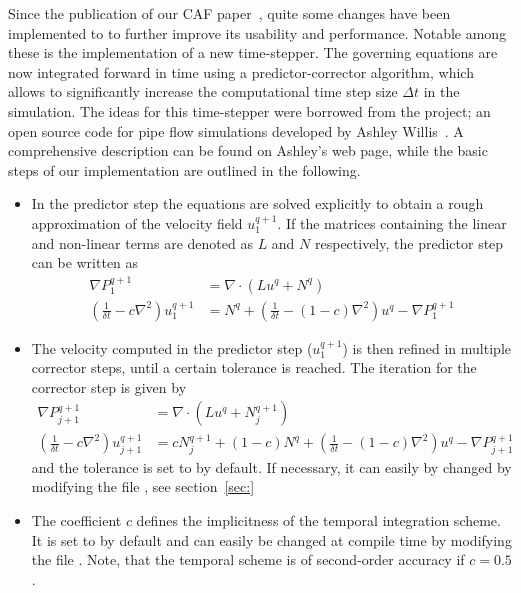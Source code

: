 \documentclass[a4paper, 11pt, DIV=11]{scrartcl}
\begin{document}
Since the publication of our CAF paper~\cite{Shi2015}, quite some changes have been
implemented to \nsc to further improve its usability and performance. Notable among
these is the implementation of a new time-stepper. The governing equations are now
integrated forward in time using a predictor-corrector algorithm, which allows to
significantly increase the computational time step size $\Delta t$ in the simulation.
The ideas for this time-stepper were borrowed from the \opf project; an open source
code for pipe flow simulations developed by Ashley Willis~\cite{Willis2017}. A
comprehensive description can be found on Ashley's web page, while the basic steps
of our implementation are outlined in the following.
\begin{itemize}

\item
In the predictor step the equations are solved explicitly to obtain a rough
approximation of the velocity field $u_1^{q+1}$. If the matrices containing
the linear and non-linear terms are denoted as $L$ and $N$ respectively, the
predictor step can be written as
\begin{align*}
\nabla P_1^{q+1} & = \nabla\cdot(Lu^q+N^q)\\
\left(\frac{1}{\delta t} - c\nabla^2\right) u_1^{q+1} & =
N^q + \left(\frac{1}{\delta t}-(1-c)\nabla^2\right) u^{q} - \nabla P_1^{q+1}
\end{align*}

\item
The velocity computed in the predictor step ($u_1^{q+1}$) is then refined in
multiple corrector steps, until a certain tolerance is reached. The iteration
for the corrector step is given by
\begin{align*}
\nabla P_{j+1}^{q+1} & = \nabla\cdot\left(Lu^q+N_j^{q+1}\right)\\
\left(\frac{1}{\delta t}-c \nabla^2\right) u_{j+1}^{q+1} & =
c N_j^{q+1} + \left(1-c\right)N^q + \left( \frac{1}{\delta t} -
\left(1-c \right) \nabla^2 \right) u^{q} - \nabla P_{j+1}^{q+1}
\end{align*}
and the tolerance is set to  by default. If
necessary, it can easily by changed by modifying the file ,
see section~\ref{sec:}

\item The coefficient $c$ defines the implicitness of the temporal integration
scheme. It is set to  by default and can easily be
changed at compile time by modifying the file . Note,
that the temporal scheme is of second-order accuracy if $c=0.5$.


\end{itemize}
\end{document}
